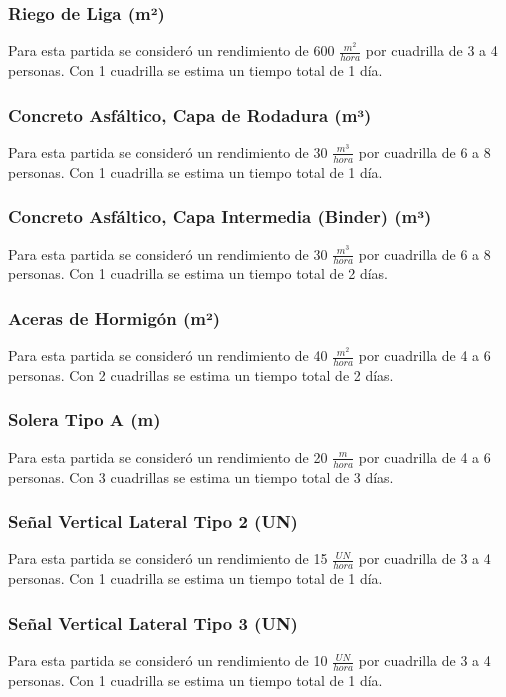 \documentclass{article} %
\begin{document}
\subsubsection{Riego de Liga (m²)}
Para esta partida se consideró un rendimiento de 600 $\frac{m^2}{hora}$ por cuadrilla de 3 a 4 personas. Con 1 cuadrilla se estima un tiempo total de 1 día.

\subsubsection{Concreto Asfáltico, Capa de Rodadura (m³)}
Para esta partida se consideró un rendimiento de 30 $\frac{m^3}{hora}$ por cuadrilla de 6 a 8 personas. Con 1 cuadrilla se estima un tiempo total de 1 día.

\subsubsection{Concreto Asfáltico, Capa Intermedia (Binder) (m³)}
Para esta partida se consideró un rendimiento de 30 $\frac{m^3}{hora}$ por cuadrilla de 6 a 8 personas. Con 1 cuadrilla se estima un tiempo total de 2 días.

\subsubsection{Aceras de Hormigón (m²)}
Para esta partida se consideró un rendimiento de 40 $\frac{m^2}{hora}$ por cuadrilla de 4 a 6 personas. Con 2 cuadrillas se estima un tiempo total de 2 días.

\subsubsection{Solera Tipo A (m)}
Para esta partida se consideró un rendimiento de 20 $\frac{m}{hora}$ por cuadrilla de 4 a 6 personas. Con 3 cuadrillas se estima un tiempo total de 3 días.

\subsubsection{Señal Vertical Lateral Tipo 2 (UN)}
Para esta partida se consideró un rendimiento de 15 $\frac{UN}{hora}$ por cuadrilla de 3 a 4 personas. Con 1 cuadrilla se estima un tiempo total de 1 día.

\subsubsection{Señal Vertical Lateral Tipo 3 (UN)}
Para esta partida se consideró un rendimiento de 10 $\frac{UN}{hora}$ por cuadrilla de 3 a 4 personas. Con 1 cuadrilla se estima un tiempo total de 1 día.
\end{document}
